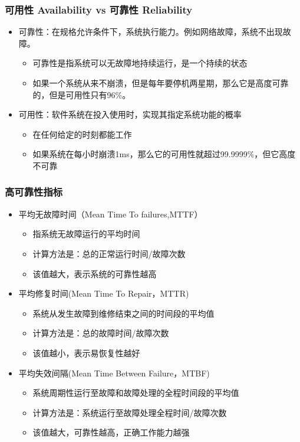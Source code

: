 \begin{frame}[fragile]
    \frametitle{可用性 Availability  vs 可靠性 Reliability}
\begin{itemize}
    \item 可靠性：在规格允许条件下，系统执行能力。例如网络故障，系统不出现故障。
   \begin{itemize}
    \item 可靠性是指系统可以无故障地持续运行，是一个持续的状态
    \item 如果一个系统从来不崩溃，但是每年要停机两星期，那么它是高度可靠的，但是可用性只有96\%。
   \end{itemize}
   \item 可用性：软件系统在投入使用时，实现其指定系统功能的概率
\begin{itemize}
    \item 在任何给定的时刻都能工作
    \item 如果系统在每小时崩溃1ms，那么它的可用性就超过99.9999\%，但它高度不可靠
\end{itemize}
\end{itemize}
\end{frame}


\begin{frame}[fragile]
    \frametitle{高可靠性指标}
\begin{itemize}
    \item 平均无故障时间（Mean Time To failures,MTTF） 
\begin{itemize}
    \item 指系统无故障运行的平均时间
    \item 计算方法是：总的正常运行时间/故障次数
    \item 该值越大，表示系统的可靠性越高
\end{itemize} \pause
    \item 平均修复时间(Mean Time To Repair，MTTR) 
 \begin{itemize}
    \item 系统从发生故障到维修结束之间的时间段的平均值
    \item 计算方法是：总的故障时间/故障次数
    \item 该值越小，表示易恢复性越好
\end{itemize}  \pause
 \item 平均失效间隔(Mean Time Between Failure，MTBF) 
 \begin{itemize}
    \item 系统周期性运行至故障和故障处理的全程时间段的平均值
    \item 计算方法是：系统运行至故障处理全程时间/故障次数
    \item 该值越大，可靠性越高，正确工作能力越强
\end{itemize}  
\end{itemize}
\end{frame}





